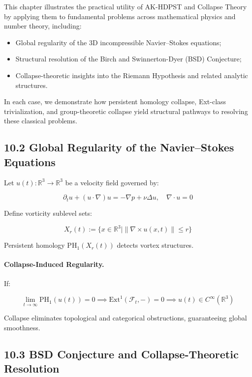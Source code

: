 \documentclass[11pt]{article}
\begin{document}
This chapter illustrates the practical utility of AK-HDPST and Collapse Theory by applying them to fundamental problems across mathematical physics and number theory, including:

\begin{itemize}
    \item Global regularity of the 3D incompressible Navier–Stokes equations;
    \item Structural resolution of the Birch and Swinnerton-Dyer (BSD) Conjecture;
    \item Collapse-theoretic insights into the Riemann Hypothesis and related analytic structures.
\end{itemize}

In each case, we demonstrate how persistent homology collapse, Ext-class trivialization, and group-theoretic collapse yield structural pathways to resolving these classical problems.

\subsection*{10.2 Global Regularity of the Navier–Stokes Equations}

Let \( u(t) : \mathbb{R}^3 \to \mathbb{R}^3 \) be a velocity field governed by:

\[
\partial_t u + (u \cdot \nabla)u = -\nabla p + \nu \Delta u, \quad \nabla \cdot u = 0
\]

Define vorticity sublevel sets:

\[
X_r(t) := \{ x \in \mathbb{R}^3 \mid \| \nabla \times u(x,t) \| \leq r \}
\]

Persistent homology \( \mathrm{PH}_1(X_r(t)) \) detects vortex structures.

\paragraph{Collapse-Induced Regularity.}
If:

\[
\lim_{t \to \infty} \mathrm{PH}_1(u(t)) = 0 \implies \mathrm{Ext}^1(\mathcal{F}_t, -) = 0 \implies u(t) \in C^\infty(\mathbb{R}^3)
\]

Collapse eliminates topological and categorical obstructions, guaranteeing global smoothness.

\subsection*{10.3 BSD Conjecture and Collapse-Theoretic Resolution}
\end{document}

